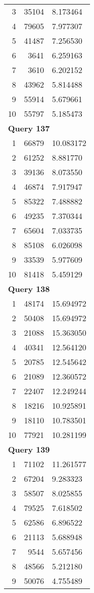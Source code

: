 \begin{longtable}[{p}]{@{}rrp{}@{}}
3 & 35104 & 8.173464 \\
4 & 79605 & 7.977307 \\
5 & 41487 & 7.256530 \\
6 & 3641 & 6.259163 \\
7 & 3610 & 6.202152 \\
8 & 43962 & 5.814488 \\
9 & 55914 & 5.679661 \\
10 & 55797 & 5.185473 \\
\midrule
\multicolumn{3}{l}{\bfseries Query 137} \\
1 & 66879 & 10.083172 \\
2 & 61252 & 8.881770 \\
3 & 39136 & 8.073550 \\
4 & 46874 & 7.917947 \\
5 & 85322 & 7.488882 \\
6 & 49235 & 7.370344 \\
7 & 65604 & 7.033735 \\
8 & 85108 & 6.026098 \\
9 & 33539 & 5.977609 \\
10 & 81418 & 5.459129 \\
\midrule
\multicolumn{3}{l}{\bfseries Query 138} \\
1 & 48174 & 15.694972 \\
2 & 50408 & 15.694972 \\
3 & 21088 & 15.363050 \\
4 & 40341 & 12.564120 \\
5 & 20785 & 12.545642 \\
6 & 21089 & 12.360572 \\
7 & 22407 & 12.249244 \\
8 & 18216 & 10.925891 \\
9 & 18110 & 10.783501 \\
10 & 77921 & 10.281199 \\
\midrule
\multicolumn{3}{l}{\bfseries Query 139} \\
1 & 71102 & 11.261577 \\
2 & 67204 & 9.283323 \\
3 & 58507 & 8.025855 \\
4 & 79525 & 7.618502 \\
5 & 62586 & 6.896522 \\
6 & 21113 & 5.688948 \\
7 & 9544 & 5.657456 \\
8 & 48566 & 5.212180 \\
9 & 50076 & 4.755489 \\

\end{longtable}

